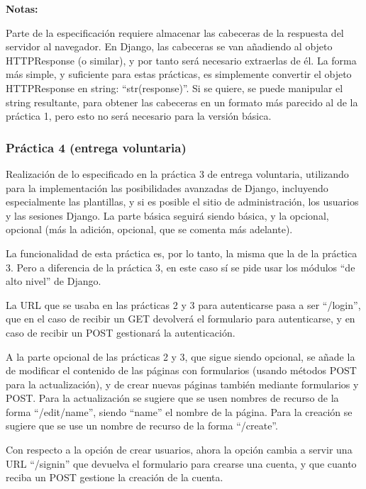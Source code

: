 \textbf{Notas:}

Parte de la especificación requiere almacenar las cabeceras de la respuesta del servidor al navegador. En Django, las cabeceras se van añadiendo al objeto HTTPResponse (o similar), y por tanto será necesario extraerlas de él. La forma más simple, y suficiente para estas prácticas, es simplemente convertir el objeto HTTPResponse en string: ``str(response)''. Si se quiere, se puede manipular el string resultante, para obtener las cabeceras en un formato más parecido al de la práctica 1, pero esto no será necesario para la versión básica.


\subsubsection{Práctica 4 (entrega voluntaria)}
\label{subsec:practica-vol-4-2010}

Realización de lo especificado en la práctica 3 de entrega voluntaria, utilizando para la implementación las posibilidades avanzadas de Django, incluyendo especialmente las plantillas, y si es posible el sitio de administración, los usuarios y las sesiones Django. La parte básica seguirá siendo básica, y la opcional, opcional (más la adición, opcional, que se comenta más adelante).

La funcionalidad de esta práctica es, por lo tanto, la misma que la de la práctica 3. Pero a diferencia de la práctica 3, en este caso sí se pide usar los módulos ``de alto nivel'' de Django.

La URL que se usaba en las prácticas 2 y 3 para autenticarse pasa a ser ``/login'', que en el caso de recibir un GET devolverá el formulario para autenticarse, y en caso de recibir un POST gestionará la autenticación.

A la parte opcional de las prácticas 2 y 3, que sigue siendo opcional, se añade la de modificar el contenido de las páginas con formularios (usando métodos POST para la actualización), y de crear nuevas páginas también mediante formularios y POST. Para la actualización se sugiere que se usen nombres de recurso de la forma ``/edit/name'', siendo ``name'' el nombre de la página. Para la creación se sugiere que se use un nombre de recurso de la forma ``/create''.

Con respecto a la opción de crear usuarios, ahora la opción cambia a servir una URL ``/signin'' que devuelva el formulario para crearse una cuenta, y que cuanto reciba un POST gestione la creación de la cuenta.

